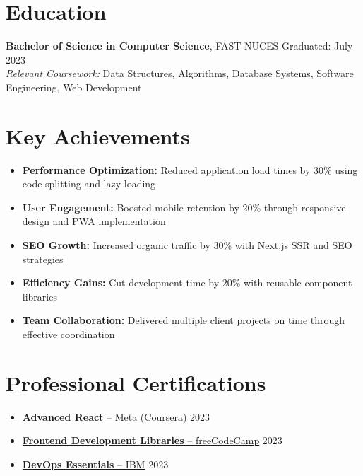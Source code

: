 \section{Education}
\textbf{Bachelor of Science in Computer Science}, FAST-NUCES \hfill Graduated: July 2023 \\
\textit{Relevant Coursework:} Data Structures, Algorithms, Database Systems, Software Engineering, Web Development

\section{Key Achievements}
\begin{itemize}
\item \textbf{Performance Optimization:} Reduced application load times by 30\% using code splitting and lazy loading
\item \textbf{User Engagement:} Boosted mobile retention by 20\% through responsive design and PWA implementation
\item \textbf{SEO Growth:} Increased organic traffic by 30\% with Next.js SSR and SEO strategies
\item \textbf{Efficiency Gains:} Cut development time by 20\% with reusable component libraries
\item \textbf{Team Collaboration:} Delivered multiple client projects on time through effective coordination
\end{itemize}

\section{Professional Certifications}
\begin{itemize}
\item \href{https://www.coursera.org/account/accomplishments/verify/QC73X86DWCRK}{\textbf{Advanced React} -- Meta (Coursera)} \hfill 2023
\item \href{https://www.freecodecamp.org/certification/fcc36860a3c-366f-4e05-8655-9eeeba048998/front-end-development-libraries}{\textbf{Frontend Development Libraries} -- freeCodeCamp} \hfill 2023
\item \href{https://www.credly.com/badges/41de71d0-506d-4fc4-98b8-3d72b7d4fd44/linked_in_profile}{\textbf{DevOps Essentials} -- IBM} \hfill 2023
\end{itemize}


